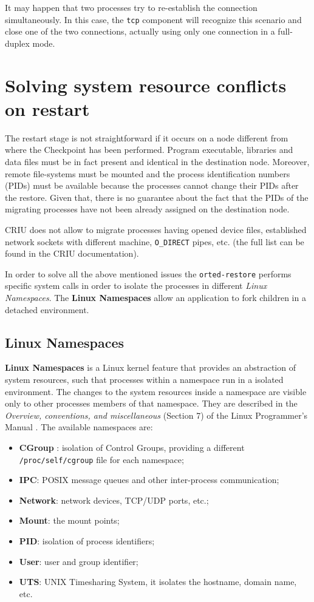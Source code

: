 It may happen that two processes try to re-establish the connection
simultaneously. In this case, the \texttt{tcp} component will recognize this
scenario and close one of the two connections, actually using only one
connection in a full-duplex mode.


\section{Solving system resource conflicts on restart}
The restart stage is not straightforward if it occurs on a node different from
where the Checkpoint has been performed. Program executable, libraries and
data files must be in fact present and identical in the destination node.
Moreover, remote file-systems must be mounted and the process identification
numbers (PIDs) must be available because the processes cannot change their
PIDs after the restore. Given that, there is no guarantee about the fact that
the PIDs of the migrating processes have not been already assigned on the
destination node.

CRIU does not allow to migrate processes having opened device files,
established network sockets with different machine, \texttt{O\_DIRECT} pipes,
etc. (the full list can be found in the CRIU documentation). 

In order to solve all the above mentioned issues the \texttt{orted-restore}
performs specific system calls in order to isolate the processes in different
\emph{Linux Namespaces}. The \textbf{Linux Namespaces} allow an application to fork children in a detached environment. 

\subsection{Linux Namespaces}
\textbf{Linux Namespaces} is a Linux kernel feature that provides an 
abstraction of system resources, such that processes within a namespace run in
a isolated environment. The changes to the system resources inside a namespace
are visible
only to other processes members of that namespace.
They are described in the \emph{Overview, conventions, and miscellaneous}
(Section 7) of the Linux Programmer's Manual \cite{LinuxNamespaces}.
The available namespaces are:
\begin{itemize}
\item \textbf{CGroup} \cite{cgroupdoc}: isolation of Control Groups, providing
a different \linebreak \texttt{/proc/self/cgroup} file for each namespace;
\item \textbf{IPC}: POSIX message queues and other inter-process communication;
\item \textbf{Network}: network devices, TCP/UDP ports, etc.;
\item \textbf{Mount}: the mount points;
\item \textbf{PID}: isolation of process identifiers; 
\item \textbf{User}: user and group identifier;
\item \textbf{UTS}: UNIX Timesharing System, it isolates the hostname,
domain name, etc.
\end{itemize}

